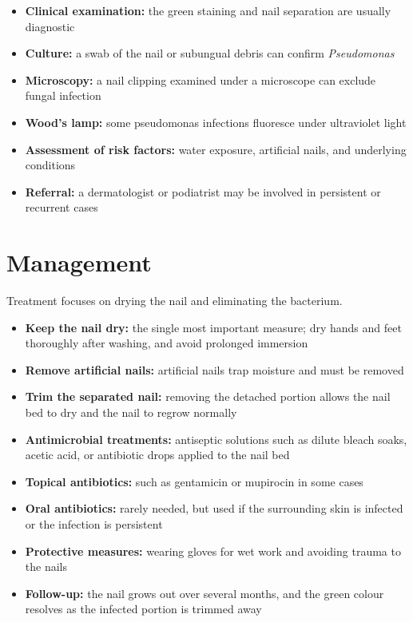 \begin{itemize}
    \item \textbf{Clinical examination:} the green staining and nail separation are usually diagnostic
    \item \textbf{Culture:} a swab of the nail or subungual debris can confirm \textit{Pseudomonas}
    \item \textbf{Microscopy:} a nail clipping examined under a microscope can exclude fungal infection
    \item \textbf{Wood's lamp:} some pseudomonas infections fluoresce under ultraviolet light
    \item \textbf{Assessment of risk factors:} water exposure, artificial nails, and underlying conditions
    \item \textbf{Referral:} a dermatologist or podiatrist may be involved in persistent or recurrent cases
\end{itemize}

\section*{Management}
Treatment focuses on drying the nail and eliminating the bacterium.

\begin{itemize}
    \item \textbf{Keep the nail dry:} the single most important measure; dry hands and feet thoroughly after washing, and avoid prolonged immersion
    \item \textbf{Remove artificial nails:} artificial nails trap moisture and must be removed
    \item \textbf{Trim the separated nail:} removing the detached portion allows the nail bed to dry and the nail to regrow normally
    \item \textbf{Antimicrobial treatments:} antiseptic solutions such as dilute bleach soaks, acetic acid, or antibiotic drops applied to the nail bed
    \item \textbf{Topical antibiotics:} such as gentamicin or mupirocin in some cases
    \item \textbf{Oral antibiotics:} rarely needed, but used if the surrounding skin is infected or the infection is persistent
    \item \textbf{Protective measures:} wearing gloves for wet work and avoiding trauma to the nails
    \item \textbf{Follow-up:} the nail grows out over several months, and the green colour resolves as the infected portion is trimmed away
\end{itemize}


